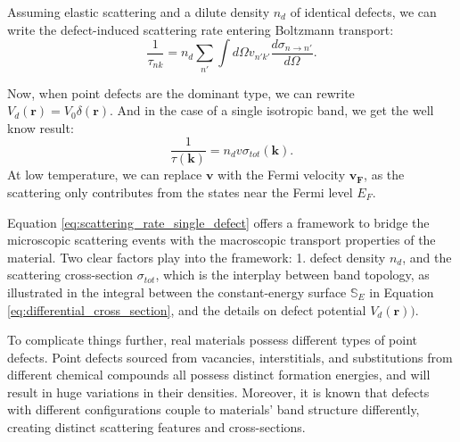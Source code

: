 Assuming elastic scattering and a dilute density $n_d$ of identical defects, we can write the defect-induced scattering rate entering Boltzmann transport: 
\begin{equation}
	\label{eq:scattering_rate_single_defect}
	\frac{1}{\tau_{nk}} = n_d \sum_{n'}\int d\Omega v_{n'k'} \frac{d\sigma_{n\rightarrow n'}}{d\Omega}. 
\end{equation}

Now, when point defects are the dominant type, we can rewrite $V_d(\mathbf{r}) = V_0\delta(\mathbf{r})$. And in the case of a single isotropic band, we get the well know result:
\begin{equation}
	\frac{1}{\tau(\mathbf{k})} = n_d v \sigma_{tot}(\mathbf{k}).
\end{equation}
At low temperature, we can replace $\mathbf{v}$ with the Fermi velocity $\mathbf{v_F}$, as the scattering only contributes from the states near the Fermi level $E_F$. 

Equation \ref{eq:scattering_rate_single_defect} offers a framework to bridge the microscopic scattering events with the macroscopic transport properties of the material. Two clear factors play into the framework: 1. defect density $n_d$, and the scattering cross-section $\sigma_{tot}$, which is the interplay between band topology, as illustrated in the integral between the constant-energy surface $\mathbb{S}_E$ in Equation \ref{eq:differential_cross_section}, and the details on defect potential $V_d(\mathbf{r}))$. 

To complicate things further, real materials possess different types of point defects\cite{stuartScanningTunnellingMicroscopy2021}\cite{bertoldoQuantumPointDefects2022}. Point defects sourced from vacancies, interstitials, and substitutions from different chemical compounds all possess distinct formation energies\cite{bertoldoQuantumPointDefects2022}\cite{lopesDefectFormationEnergy2023}, and will result in huge variations in their densities. Moreover, it is known that defects with different configurations couple to materials' band structure differently, creating distinct scattering features and cross-sections\cite{butlerQuasiparticleInterferenceZrSiS2017}\cite{chiSignInversionSuperconducting2014}\cite{derryQuasiparticleInterferenceMagnetic2015a}.

